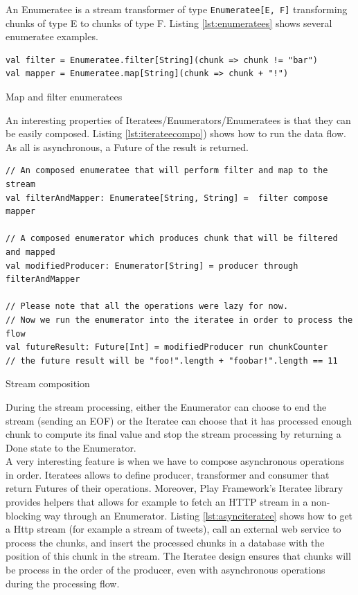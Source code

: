 An Enumeratee is a stream transformer of type \verb|Enumeratee[E, F]| transforming chunks of type E to chunks of type F.
Listing \ref{lst:enumeratees} shows several enumeratee examples.

\begin{listing}[h]
\begin{verbatim}
val filter = Enumeratee.filter[String](chunk => chunk != "bar")
val mapper = Enumeratee.map[String](chunk => chunk + "!")
\end{verbatim}
\caption{Map and filter enumeratees}
\label{lst:enumeratees}
\end{listing}

An interesting properties of Iteratees/Enumerators/Enumeratees is that they can be easily composed. Listing \ref{lst:iterateecompo}) shows how to
run the data flow. As all is asynchronous, a Future of the result is returned. 

\begin{listing}[h]
\begin{verbatim}
// An composed enumeratee that will perform filter and map to the stream
val filterAndMapper: Enumeratee[String, String] =  filter compose mapper

// A composed enumerator which produces chunk that will be filtered and mapped
val modifiedProducer: Enumerator[String] = producer through filterAndMapper

// Please note that all the operations were lazy for now.
// Now we run the enumerator into the iteratee in order to process the flow
val futureResult: Future[Int] = modifiedProducer run chunkCounter
// the future result will be "foo!".length + "foobar!".length == 11
\end{verbatim}
\caption{Stream composition}
\label{lst:iterateecompo}
\end{listing}

During the stream processing, either the Enumerator can choose to end the stream (sending an EOF) or the Iteratee can choose that it has processed enough
chunk to compute its final value and stop the stream processing by returning a Done state to the Enumerator.
\\

A very interesting feature is when we have to compose asynchronous operations in order. Iteratees allows to define
producer, transformer and consumer that return Futures of their operations. Moreover, Play Framework's Iteratee library
provides helpers that allows for example to fetch an HTTP stream in a non-blocking way through an Enumerator.
Listing \ref{lst:asynciteratee} shows how to get a Http stream (for example a stream of tweets), call an external web service to process
the chunks, and insert the processed chunks in a database with the position of this chunk in the stream. 
The Iteratee design ensures that chunks will be process in the order of the producer, even with asynchronous
operations during the processing flow.

